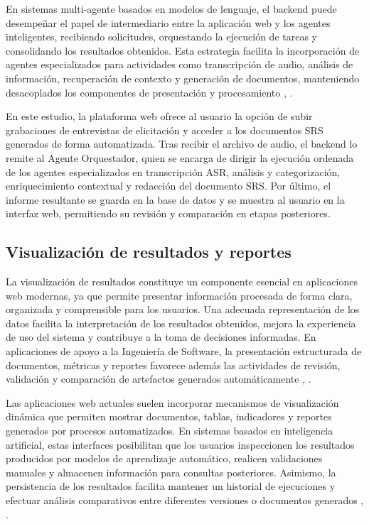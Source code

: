 En sistemas multi-agente basados en modelos de lenguaje, el backend puede desempeñar el papel de intermediario entre la aplicación web y los 
agentes inteligentes, recibiendo solicitudes, orquestando la ejecución de tareas y consolidando los resultados obtenidos. Esta estrategia 
facilita la incorporación de agentes especializados para actividades como transcripción de audio, análisis de información, recuperación de 
contexto y generación de documentos, manteniendo desacoplados los componentes de presentación y procesamiento \cite{newman2021building}, \cite{Guo2024}.

En este estudio, la plataforma web ofrece al usuario la opción de subir grabaciones de entrevistas de elicitación y acceder a los documentos 
SRS generados de forma automatizada. Tras recibir el archivo de audio, el backend lo remite al Agente Orquestador, quien se encarga de dirigir 
la ejecución ordenada de los agentes especializados en transcripción ASR, análisis y categorización, enriquecimiento contextual y redacción del 
documento SRS. Por último, el informe resultante se guarda en la base de datos y se muestra al usuario en la interfaz web, permitiendo su revisión 
y comparación en etapas posteriores.



\subsection{Visualización de resultados y reportes}
La visualización de resultados constituye un componente esencial en aplicaciones web modernas, ya que permite presentar información procesada 
de forma clara, organizada y comprensible para los usuarios. Una adecuada representación de los datos facilita la interpretación de los resultados 
obtenidos, mejora la experiencia de uso del sistema y contribuye a la toma de decisiones informadas. En aplicaciones de apoyo a la Ingeniería de 
Software, la presentación estructurada de documentos, métricas y reportes favorece además las actividades de revisión, validación y comparación de 
artefactos generados automáticamente \cite{richards2020fundamentals}, \cite{newman2021building}.

Las aplicaciones web actuales suelen incorporar mecanismos de visualización dinámica que permiten mostrar documentos, tablas, indicadores y 
reportes generados por procesos automatizados. En sistemas basados en inteligencia artificial, estas interfaces posibilitan que los usuarios 
inspeccionen los resultados producidos por modelos de aprendizaje automático, realicen validaciones manuales y almacenen información para 
consultas posteriores. Asimismo, la persistencia de los resultados facilita mantener un historial de ejecuciones y efectuar análisis comparativos 
entre diferentes versiones o documentos generados \cite{richards2020fundamentals}, \cite{Umar2024}.

